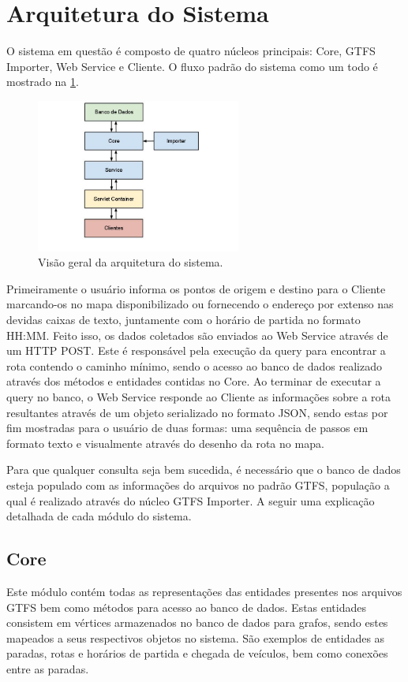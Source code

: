 \section{Arquitetura do Sistema}
O sistema em questão é composto de quatro núcleos principais: Core, GTFS Importer, Web Service e Cliente. 
O fluxo padrão do sistema como um todo é mostrado na \ref{fig:arquitetura}.
\begin{figure}[!htb]
	\centering
	\includegraphics[width=0.6\textwidth]{./arquitetura.jpg}
	\caption[ImgArquitetura]{Visão geral da arquitetura do sistema.}
	\label{fig:arquitetura}
\end{figure}
Primeiramente o usuário informa os pontos de origem e destino para o Cliente marcando-os no mapa disponibilizado ou fornecendo o endereço por extenso nas devidas caixas de texto, juntamente com o horário de partida no formato HH:MM. 
Feito isso, os dados coletados são enviados ao Web Service através de um HTTP POST. 
Este é responsável pela execução da query para encontrar a rota contendo o caminho mínimo, sendo o acesso ao banco de dados realizado através dos métodos e entidades contidas no Core.
Ao terminar de executar a query no banco, o Web Service responde ao Cliente as informações sobre a rota resultantes através de um objeto serializado no formato JSON, sendo estas por fim mostradas para o usuário de duas formas: uma sequência de passos em formato texto e visualmente através do desenho da rota no mapa.

Para que qualquer consulta seja bem sucedida, é necessário que o banco de dados esteja populado com as informações do arquivos no padrão GTFS, população a qual é realizado através do núcleo GTFS Importer.
A seguir uma explicação detalhada de cada módulo do sistema.

\subsection{Core}
Este módulo contém todas as representações das entidades presentes nos arquivos GTFS bem como métodos para acesso ao banco de dados. 
Estas entidades consistem em vértices armazenados no banco de dados para grafos, sendo estes mapeados a seus respectivos objetos no sistema.
São exemplos de entidades as paradas, rotas e horários de partida e chegada de veículos, bem como conexões entre as paradas.

